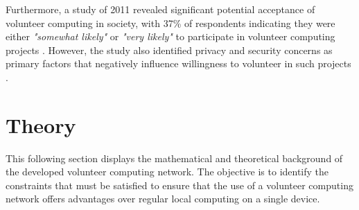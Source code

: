 Furthermore, a study of 2011 revealed significant potential acceptance of volunteer computing in society, with 37\% of respondents indicating they were either \emph{"somewhat likely"} or \emph{"very likely"} to participate in volunteer computing projects \cite{intro:volunteerStudy}. However, the study also identified privacy and security concerns as primary factors that negatively influence willingness to volunteer in such projects \cite{intro:volunteerStudy}.

\section{Theory}
\label{sec:background:theory}
This following section displays the mathematical and theoretical background of the developed volunteer computing network. The objective is to identify the constraints that must be satisfied to ensure that the use of a volunteer computing network offers advantages over regular local computing on a single device.

